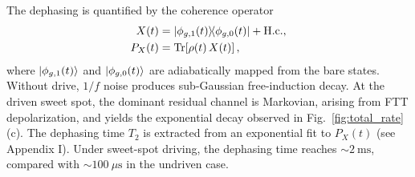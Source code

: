 The dephasing is quantified by the coherence operator
\begin{align}
X(t) &= |\phi_{g,1}(t)\rangle\!\langle\phi_{g,0}(t)| + \mathrm{H.c.}, \\
P_X(t) &= \mathrm{Tr}\!\left[\rho(t)\,X(t)\right],
\end{align}
where $|\phi_{g,1}(t)\rangle$ and $|\phi_{g,0}(t)\rangle$ are adiabatically mapped from the bare states.
Without drive, \(1/f\) noise produces sub-Gaussian free-induction decay. At the driven sweet spot, the dominant residual channel is Markovian, arising from FTT depolarization, and yields the exponential decay observed in Fig.~\ref{fig:total_rate}(c). The dephasing time \(T_2\) is extracted from an exponential fit to \(P_X(t)\) (see Appendix I). Under sweet-spot driving, the dephasing time reaches \(\sim 2~\mathrm{ms}\), compared with \(\sim 100~\mu\mathrm{s}\) in the undriven case.